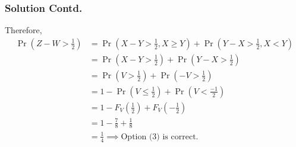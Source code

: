 \documentclass{beamer}
\providecommand{\pr}[1]{\ensuremath{\Pr\left(#1\right)}}
\begin{document}
\begin{frame}
\frametitle{Solution Contd.}
 Therefore,
\begin{align}
    \pr{Z-W >\frac{1}{2}} &= \pr{X-Y>\frac{1}{2},X \geq Y}+\pr{Y-X >\frac{1}{2}, X < Y}\\
    &= \pr{X-Y>\frac{1}{2}} +\pr{Y-X>\frac{1}{2}}\\
    &= \pr{V > \frac{1}{2}} + \pr{-V > \frac{1}{2}}\\
    &= 1 - \pr{V \leq \frac{1}{2}} + \pr{V < \frac{-1}{2}}\\
    &= 1-F_V(\frac{1}{2}) + F_V(-\frac{1}{2})\\
    &= 1 -\frac{7}{8} + \frac{1}{8} \\
    &= \frac{1}{4} \implies \text{Option (3) is correct.} \nonumber
\end{align}   
\end{frame}
\end{document}
